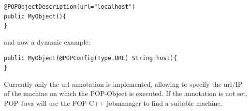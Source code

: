 \begin{lstlisting}
@POPObjectDescription(url="localhost")
public MyObject(){
}
\end{lstlisting}\s

and now a dynamic example:
\begin{lstlisting}
public MyObject(@POPConfig(Type.URL) String host){
}
\end{lstlisting}\s

Currently only the url annotation is implemented, allowing to specify the url/IP of the machine on which the POP-Object is executed.
If the annotation is not set, POP-Java will use the POP-C++ jobmanager to find a suitable machine.

